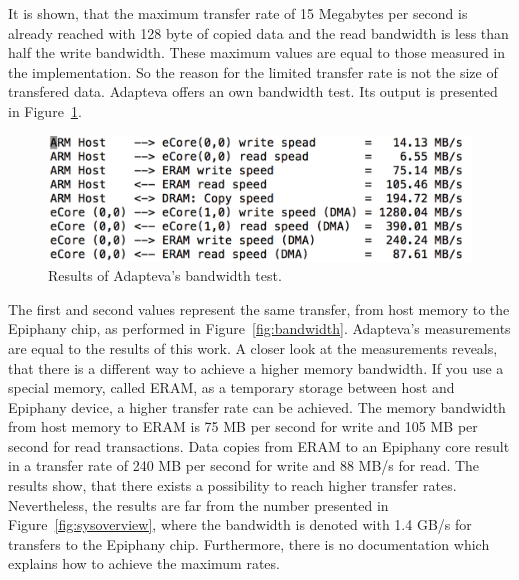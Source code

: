 \documentclass[american, hauptseminar, twoside]{zihpub}
\begin{document}
						It is shown, that the maximum transfer rate of 15 Megabytes per second is already reached with 128 byte of copied data and the read bandwidth is less than half the write bandwidth. These maximum values are equal to those measured in the implementation. So the reason for the limited transfer rate is not the size of transfered data. Adapteva offers an own bandwidth test. Its output is presented in Figure~\ref{fig:ada_bandwidth}.
						\begin{figure}[h]
							\begin{center}
								\includegraphics[width=\textwidth]{grafiken/adapteva_bandwidth.png}
								\caption{Results of Adapteva's bandwidth test.}
								\label{fig:ada_bandwidth}
							\end{center}
						\end{figure}
						The first and second values represent the same transfer, from host memory to the Epiphany chip, as performed in Figure~\ref{fig:bandwidth}. Adapteva's measurements are equal to the results of this work. A closer look at the measurements reveals, that there is a different way to achieve a higher memory bandwidth. If you use a special memory, called ERAM, as a temporary storage between host and Epiphany device, a higher transfer rate can be achieved. The memory bandwidth from host memory to ERAM is 75 MB per second for write and 105 MB per second for read transactions. Data copies from ERAM to an Epiphany core result in a transfer rate of 240 MB per second for write and 88 MB/s for read. The results show, that there exists a possibility to reach higher transfer rates. Nevertheless, the results are far from the number presented in Figure~\ref{fig:sysoverview}, where the bandwidth is denoted with 1.4 GB/s for transfers to the Epiphany chip. Furthermore, there is no documentation which explains how to achieve the maximum rates. 
\end{document}
